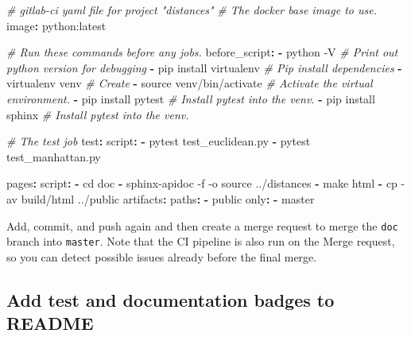 \documentclass[11pt]{article}
\newenvironment{Shaded}{}{}
\newcommand{\KeywordTok}[1]{\textcolor[rgb]{0.00,0.44,0.13}{\textbf{{#1}}}}
\newcommand{\CommentTok}[1]{\textcolor[rgb]{0.38,0.63,0.69}{\textit{{#1}}}}
\newcommand{\FunctionTok}[1]{\textcolor[rgb]{0.02,0.16,0.49}{{#1}}}
\newcommand{\AttributeTok}[1]{\textcolor[rgb]{0.49,0.56,0.16}{{#1}}}
\begin{document}
\begin{Shaded}
\begin{Highlighting}[]
\CommentTok{\# gitlab{-}ci yaml file for project "distances"}
\CommentTok{\# The docker base image to use.}
\FunctionTok{image}\KeywordTok{:}\AttributeTok{ python:latest}

\CommentTok{\# Run these commands before any jobs.}
\FunctionTok{before\_script}\KeywordTok{:}
\AttributeTok{  }\KeywordTok{{-}}\AttributeTok{ python {-}V}\CommentTok{                 \# Print out python version for debugging}
\AttributeTok{  }\KeywordTok{{-}}\AttributeTok{ pip install virtualenv}\CommentTok{    \# Pip install dependencies}
\AttributeTok{  }\KeywordTok{{-}}\AttributeTok{ virtualenv venv}\CommentTok{           \# Create }
\AttributeTok{  }\KeywordTok{{-}}\AttributeTok{ source venv/bin/activate}\CommentTok{  \# Activate the virtual environment.}
\AttributeTok{  }\KeywordTok{{-}}\AttributeTok{ pip install pytest}\CommentTok{        \# Install pytest into the venv.}
\AttributeTok{  }\KeywordTok{{-}}\AttributeTok{ pip install sphinx}\CommentTok{        \# Install pytest into the venv.}

\CommentTok{\# The test job }
\FunctionTok{test}\KeywordTok{:}
\AttributeTok{  }\FunctionTok{script}\KeywordTok{:}
\AttributeTok{    }\KeywordTok{{-}}\AttributeTok{ pytest test\_euclidean.py}
\AttributeTok{    }\KeywordTok{{-}}\AttributeTok{ pytest test\_manhattan.py}

\FunctionTok{pages}\KeywordTok{:}
\AttributeTok{  }\FunctionTok{script}\KeywordTok{:}
\AttributeTok{    }\KeywordTok{{-}}\AttributeTok{ cd doc}
\AttributeTok{    }\KeywordTok{{-}}\AttributeTok{ sphinx{-}apidoc {-}f {-}o source ../distances}
\AttributeTok{    }\KeywordTok{{-}}\AttributeTok{ make html}
\AttributeTok{    }\KeywordTok{{-}}\AttributeTok{ cp {-}av build/html ../public}
\AttributeTok{  }\FunctionTok{artifacts}\KeywordTok{:}
\AttributeTok{    }\FunctionTok{paths}\KeywordTok{:}
\AttributeTok{      }\KeywordTok{{-}}\AttributeTok{ public}
\AttributeTok{  }\FunctionTok{only}\KeywordTok{:}
\AttributeTok{    }\KeywordTok{{-}}\AttributeTok{ master}
\end{Highlighting}
\end{Shaded}

Add, commit, and push again and then create a merge request to merge the
\texttt{doc} branch into \texttt{master}. Note that the CI pipeline is
also run on the Merge request, so you can detect possible issues already
before the final merge.

    \hypertarget{add-test-and-documentation-badges-to-readme}{%
\subsection{Add test and documentation badges to
README}\label{add-test-and-documentation-badges-to-readme}}
\end{document}
